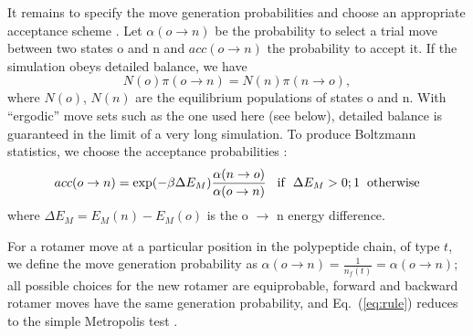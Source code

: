 It remains to specify the move generation probabilities and choose an appropriate acceptance scheme \cite{Metropolis53,
FrenkelBK,GrimmetBK}. Let $\alpha(o \rightarrow n)$ be the probability to select a trial move between two states
o and n and $acc(o \rightarrow n)$ the probability to accept it. If the simulation obeys detailed balance, we have
\begin{equation}
N(o) \pi(o \rightarrow n) = N(n) \pi(n \rightarrow o), \label{eq:balance}
\end{equation}
where $N(o)$, $N(n)$ are the equilibrium populations of states o and n. With ``ergodic'' move sets such as the one
used here (see below), detailed balance is guaranteed in the limit of a very long simulation. To produce Boltzmann
statistics, we choose the acceptance probabilities \cite{Metropolis53,FrenkelBK,GrimmetBK}:
\begin{equation} \label{eq:rule}
acc(o \rightarrow n) = \exp(-\beta \Delta E_M) \frac{ \alpha(n \rightarrow o) }{ \alpha(o \rightarrow n) }
{\rm \hspace*{3mm} if \hspace*{2mm} } \Delta E_M > 0; 1 {\rm \hspace*{2mm} otherwise}
\end{equation}
where $\Delta E_M = E_M(n) - E_M(o)$ is the o $\rightarrow$ n energy difference. 

For a rotamer move at a particular position in the polypeptide chain, of type $t$, we define the move generation
probability as $\alpha(o \rightarrow n) = \frac{1}{n_f(t)} = \alpha(o \rightarrow n)$; all possible choices for
the new rotamer are equiprobable, forward and backward rotamer moves have the same generation probability, and
Eq.\ (\ref{eq:rule}) reduces to the simple Metropolis test \cite{Metropolis53}.

